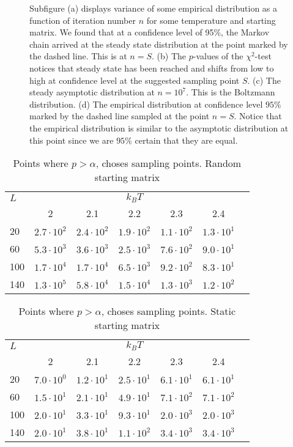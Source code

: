 \documentclass[11pt,english,a4paper]{article}
\begin{document}
\begin{figure}[!h]
\center

\caption{Subfigure (a) displays variance of some empirical distribution as a function of iteration number $n$ for some temperature and starting matrix. We found that at a confidence level of 95\%, the Markov chain arrived at the steady state distribution at the point marked by the dashed line. This is at $n = S$. (b) The $p$-values of the $\chi^2$-test notices that steady state has been reached and shifts from low to high at confidence level at the suggested sampling point $S$. (c) The steady asymptotic distribution at $n = 10^7$. This is the Boltzmann distribution. (d) The empirical distribution at confidence level $95\%$ marked by the dashed line sampled at the point $n=S$. Notice that the empirical distribution is similar to the asymptotic distribution at this point since we are $95\%$ certain that they are equal.}\label{fig:sampl}
\end{figure}
\begin{table}[!h]
\center
\begin{tabular}{l c c c c c c}
$L$ & \multicolumn{5}{c}{$k_BT$} \\
		&2					&2.1			&2.2			&2.3			&2.4\\
\hline
20  	&$2.7\cdot 10^2$	&$2.4\cdot 10^2$&$1.9\cdot 10^2$&$1.1\cdot 10^2$&$1.3\cdot 10^1$\\
60		&$5.3\cdot 10^3$	&$3.6\cdot 10^3$&$2.5\cdot 10^3$&$7.6\cdot 10^2$&$9.0\cdot 10^1$\\
100		&$1.7\cdot 10^4$	&$1.7\cdot 10^4$&$6.5\cdot 10^3$&$9.2\cdot 10^2$&$8.3\cdot 10^1$\\
140		&$1.3\cdot 10^5$	&$5.8\cdot 10^4$&$1.5\cdot 10^4$&$1.3\cdot 10^3$&$1.2\cdot 10^2$
\end{tabular}
\caption{Points where $p > \alpha$, choses sampling points. Random starting matrix} \label{tab:sprand}
\end{table}%
\begin{table}[!h]
\center
\begin{tabular}{l c c c c c c}
$L$ & \multicolumn{5}{c}{$k_BT$} \\
		&2					&2.1			&2.2			&2.3			&2.4\\
\hline
20  	&$7.0\cdot 10^0$	&$1.2\cdot 10^1$&$2.5\cdot 10^1$&$6.1\cdot 10^1$&$6.1\cdot 10^1$\\
60		&$1.5\cdot 10^1$	&$2.1\cdot 10^1$&$4.9\cdot 10^1$&$7.1\cdot 10^2$&$7.1\cdot 10^2$\\
100		&$2.0\cdot 10^1$	&$3.3\cdot 10^1$&$9.3\cdot 10^1$&$2.0\cdot 10^3$&$2.0\cdot 10^3$\\
140		&$2.0\cdot 10^1$	&$3.8\cdot 10^1$&$1.1\cdot 10^2$&$3.4\cdot 10^3$&$3.4\cdot 10^3$
\end{tabular}
\caption{Points where $p > \alpha$, choses sampling points. Static starting matrix} \label{tab:spstat}
\end{table}%
\end{document}
